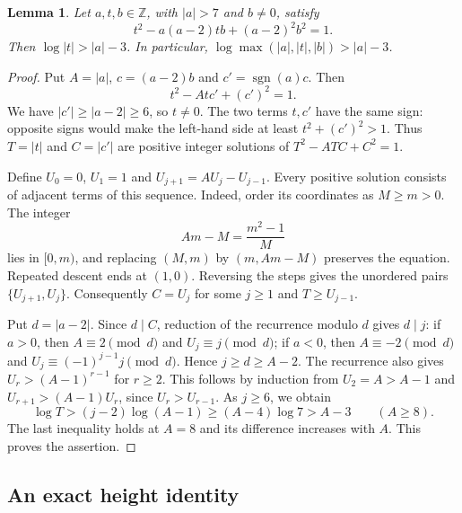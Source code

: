 \documentclass[11pt,a4paper]{article}
\newtheorem{lemma}[theorem]{Lemma}
\theoremstyle{definition}
\theoremstyle{remark}
\begin{document}
\begin{lemma}\label{lem:lucas-growth-elementary}
Let $a,t,b\in\mathbb Z$, with $|a|>7$ and $b\ne0$, satisfy
\[
 t^2-a(a-2)tb+(a-2)^2b^2=1.
\]
Then $\log|t|>|a|-3$. In particular,
$\log\max(|a|,|t|,|b|)>|a|-3$.
\end{lemma}
\begin{proof}
Put $A=|a|$, $c=(a-2)b$ and $c'=\operatorname{sgn}(a)c$.
Then
\[
                       t^2-Atc'+(c')^2=1.
\]
We have $|c'|\ge|a-2|\ge6$, so $t\ne0$. The two terms $t,c'$
have the same sign: opposite signs would make the left-hand side
at least $t^2+(c')^2>1$. Thus $T=|t|$ and $C=|c'|$ are positive
integer solutions of $T^2-ATC+C^2=1$.

Define $U_0=0$, $U_1=1$ and $U_{j+1}=AU_j-U_{j-1}$.
Every positive solution consists of adjacent terms of this sequence.
Indeed, order its coordinates as $M\ge m>0$. The integer
\[
                     Am-M=\frac{m^2-1}{M}
\]
lies in $[0,m)$, and replacing $(M,m)$ by $(m,Am-M)$ preserves
the equation. Repeated descent ends at $(1,0)$. Reversing the
steps gives the unordered pairs $\{U_{j+1},U_j\}$. Consequently
$C=U_j$ for some $j\ge1$ and $T\ge U_{j-1}$.

Put $d=|a-2|$. Since $d\mid C$, reduction of the recurrence
modulo $d$ gives $d\mid j$: if $a>0$, then $A\equiv2\pmod d$
and $U_j\equiv j\pmod d$; if $a<0$, then $A\equiv-2\pmod d$
and $U_j\equiv(-1)^{j-1}j\pmod d$. Hence $j\ge d\ge A-2$.
The recurrence also gives $U_r>(A-1)^{r-1}$ for $r\ge2$.
This follows by induction from $U_2=A>A-1$ and
$U_{r+1}>(A-1)U_r$, since $U_r>U_{r-1}$.
As $j\ge6$, we obtain
\[
 \log T>(j-2)\log(A-1)\ge(A-4)\log7>A-3
 \qquad(A\ge8).
\]
The last inequality holds at $A=8$ and its difference increases
with $A$. This proves the assertion.
\end{proof}

\subsection{An exact height identity}
\end{document}
